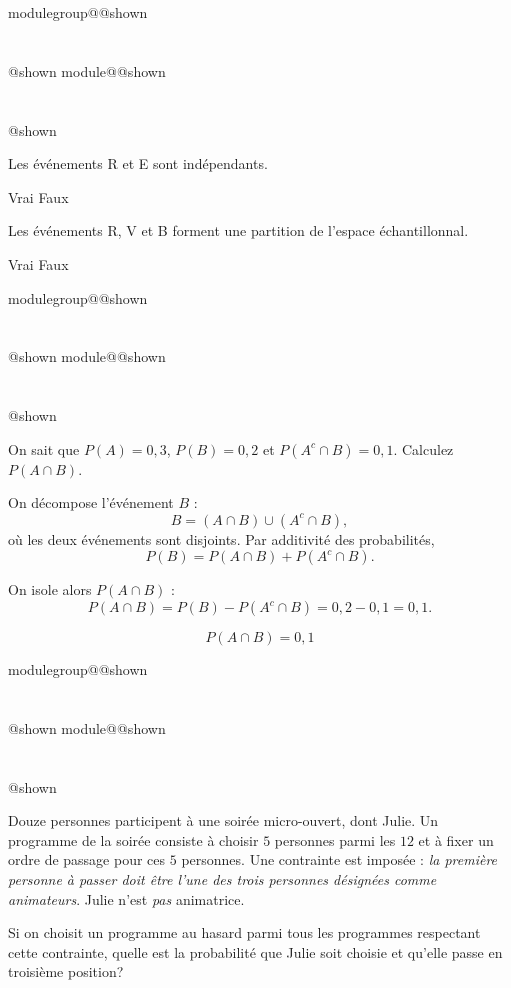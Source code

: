 \documentclass{Evaluation}
\makeatletter
\newcommand{\currentmodulekey}{}
\newcommand{\currentmoduletitle}{}
\newcommand{\currentgroupkey}{}
\newcommand{\currentgrouptitle}{}
\newcommand{\showmoduleifneeded}{%
  \ifx\currentgroupkey\empty\else
    \expandafter\ifx\csname modulegroup@\currentgroupkey @shown\endcsname\relax
      \section*{\currentgrouptitle}%
      \expandafter\gdef\csname modulegroup@\currentgroupkey @shown\endcsname{1}%
    \fi
  \fi
  \expandafter\ifx\csname module@\currentmodulekey @shown\endcsname\relax
    \section*{\currentmoduletitle}%
    \expandafter\gdef\csname module@\currentmodulekey @shown\endcsname{1}%
  \fi
}
\newenvironment{H26}{\showmoduleifneeded}{}
\newenvironment{H26r}{\showmoduleifneeded}{}
\makeatother
\begin{document}
\begin{questions}
\begin{H26}
\begin{parts}
\begin{subparts}
        \subpart[1] Les événements R et E sont indépendants.
        
        \begin{oneparcheckboxes}
            \choice Vrai
            \correctchoice Faux
        \end{oneparcheckboxes}

        \subpart[1] Les événements R, V et B forment une partition de l'espace échantillonnal.
        
        \begin{oneparcheckboxes}
            \correctchoice Vrai
            \choice Faux
        \end{oneparcheckboxes}
    \end{subparts}
    
\end{parts}
\end{H26}

\begin{H26r}
\question {} %

On sait que \(P(A)=0{,}3\), \(P(B)=0{,}2\) et \(P(A^c \cap B)=0{,}1\).
Calculez \(P(A \cap B)\).

\begin{solution}
On décompose l’événement \(B\) :
\[
B = (A \cap B) \cup (A^c \cap B),
\]
où les deux événements sont disjoints. Par additivité des probabilités,
\[
P(B) = P(A \cap B) + P(A^c \cap B).
\]

On isole alors \(P(A \cap B)\) :
\[
P(A \cap B) = P(B) - P(A^c \cap B) = 0{,}2 - 0{,}1 = 0{,}1.
\]

\[
\boxed{P(A \cap B) = 0{,}1}
\]    
\end{solution}
\end{H26r}

\begin{H26r}
\question {} %

Douze personnes participent à une soirée micro-ouvert, dont Julie. Un programme de la soirée consiste à choisir \(5\) personnes parmi les \(12\) et à fixer un ordre de passage pour ces \(5\) personnes. Une contrainte est imposée :
\emph{la première personne à passer doit être l’une des trois personnes désignées comme animateurs}.
Julie n’est \emph{pas} animatrice.

Si on choisit un programme au hasard parmi tous les programmes respectant cette contrainte, quelle est la probabilité que Julie soit choisie et qu’elle passe en troisième position?

\begin{solution}


\end{solution}
\end{H26r}
\end{questions}
\end{document}
